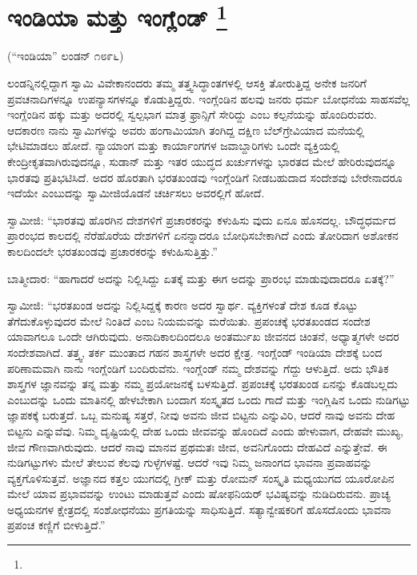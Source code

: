 
\chapter[ಇಂಡಿಯಾ ಮತ್ತು ಇಂಗ್ಲೆಂಡ್ ]{ಇಂಡಿಯಾ ಮತ್ತು ಇಂಗ್ಲೆಂಡ್ \protect\footnote{}}

\centerline{(“ಇಂಡಿಯಾ” ಲಂಡನ್​ ೧೮೯೬)}

ಲಂಡನ್ನಿನಲ್ಲಿದ್ದಾಗ ಸ್ವಾಮಿ ವಿವೇಕಾನಂದರು ತಮ್ಮ ತತ್ತ್ವಸಿದ್ಧಾಂತಗಳಲ್ಲಿ ಆಸಕ್ತಿ ತೋರುತ್ತಿದ್ದ ಅನೇಕ ಜನರಿಗೆ ಪ್ರವಚನಾದಿಗಳನ್ನೂ ಉಪನ್ಯಾಸಗಳನ್ನೂ ಕೊಡುತ್ತಿದ್ದರು. ಇಂಗ್ಲೆಂಡಿನ ಹಲವು ಜನರು ಧರ್ಮ ಬೋಧನೆಯ ಸಾಹಸವೆಲ್ಲ ಇಂಗ್ಲೆಂಡಿನ ಹಕ್ಕು ಮತ್ತು ಅದರಲ್ಲಿ ಸ್ವಲ್ಪಭಾಗ ಮಾತ್ರ ಫ್ರಾನ್ಸಿಗೆ ಸೇರಿದ್ದು ಎಂಬ ಕಲ್ಪನೆಯನ್ನು ಹೊಂದಿರುವರು. ಆದಕಾರಣ ನಾನು ಸ್ವಾಮಿಗಳನ್ನು ಅವರು ಹಂಗಾಮಿಯಾಗಿ ತಂಗಿದ್ದ ದಕ್ಷಿಣ ಬೆಲ್​ಗ್ರೇವಿಯಾದ ಮನೆಯಲ್ಲಿ ಭೇಟಿಮಾಡಲು ಹೋದೆ. ನ್ಯಾಯಾಂಗ ಮತ್ತು ಕಾರ್ಯಾಂಗಗಳ ಜವಾಬ್ದಾರಿಗಳು ಒಂದೇ ವ್ಯಕ್ತಿಯಲ್ಲಿ ಕೇಂದ್ರೀಕೃತವಾಗಿರುವುದನ್ನೂ, ಸುಡಾನ್​ ಮತ್ತು ಇತರ ಯುದ್ಧದ ಖರ್ಚುಗಳನ್ನು ಭಾರತದ ಮೇಲೆ ಹೇರಿರುವುದನ್ನೂ ಭಾರತವು ಪ್ರತಿಭಟಿಸಿದೆ. ಅದರ ಹೊರತಾಗಿ ಭರತಖಂಡವು ಇಂಗ್ಲೆಂಡಿಗೆ ನೀಡಬಹುದಾದ ಸಂದೇಶವು ಬೇರೇನಾದರೂ ಇದೆಯೇ ಎಂಬುದನ್ನು ಸ್ವಾಮೀಜಿಯೊಡನೆ ಚರ್ಚಿಸಲು ಅವರಲ್ಲಿಗೆ ಹೋದೆ.

ಸ್ವಾಮೀಜಿ: “ಭಾರತವು ಹೊರಗಿನ ದೇಶಗಳಿಗೆ ಪ್ರಚಾರಕರನ್ನು ಕಳುಹಿಸು ವುದು ಏನೂ ಹೊಸದಲ್ಲ. ಬೌದ್ಧಧರ್ಮದ ಪ್ರಾರಂಭದ ಕಾಲದಲ್ಲಿ ನೆರೆಹೊರೆಯ ದೇಶಗಳಿಗೆ ಏನನ್ನಾದರೂ ಬೋಧಿಸಬೇಕಾಗಿದೆ ಎಂದು ತೋರಿದಾಗ ಅಶೋಕನ ಕಾಲದಿಂದಲೇ ಭರತಖಂಡವು ಪ್ರಚಾರಕರನ್ನು ಕಳುಹಿಸುತ್ತಿತ್ತು.”

ಬಾತ್ಮೀದಾರ: “ಹಾಗಾದರೆ ಅದನ್ನು ನಿಲ್ಲಿಸಿದ್ದು ಏತಕ್ಕೆ ಮತ್ತು ಈಗ ಅದನ್ನು ಪ್ರಾರಂಭ ಮಾಡುವುದಾದರೂ ಏತಕ್ಕೆ?”

ಸ್ವಾಮೀಜಿ: “ಭರತಖಂಡ ಅದನ್ನು ನಿಲ್ಲಿಸಿದ್ದಕ್ಕೆ ಕಾರಣ ಅದರ ಸ್ವಾರ್ಥ. ವ್ಯಕ್ತಿಗಳಂತೆ ದೇಶ ಕೂಡ ಕೊಟ್ಟು ತೆಗೆದುಕೊಳ್ಳುವುದರ ಮೇಲೆ ನಿಂತಿದೆ ಎಂಬ ನಿಯಮವನ್ನು ಮರೆಯಿತು. ಪ್ರಪಂಚಕ್ಕೆ ಭರತಖಂಡದ ಸಂದೇಶ ಯಾವಾಗಲೂ ಒಂದೇ ಆಗಿರುವುದು. ಅನಾದಿಕಾಲದಿಂದಲೂ ಅಂತರ್ಮುಖ ಜೀವನದ ಚಿಂತನೆ, ಅಧ್ಯಾತ್ಮಗಳೇ ಅದರ ಸಂದೇಶವಾಗಿದೆ. ತತ್ತ್ವ, ತರ್ಕ ಮುಂತಾದ ಗಹನ ಶಾಸ್ತ್ರಗಳೇ ಅದರ ಕ್ಷೇತ್ರ. ಇಂಗ್ಲೆಂಡ್​ ಇಂಡಿಯಾ ದೇಶಕ್ಕೆ ಬಂದ ಪರಿಣಾಮವಾಗಿ ನಾನು ಇಂಗ್ಲೆಂಡಿಗೆ ಬಂದಿರುವೆನು. ಇಂಗ್ಲೆಂಡ್​ ನಮ್ಮ ದೇಶವನ್ನು ಗೆದ್ದು ಆಳುತ್ತಿದೆ. ಅದು ಭೌತಿಕ ಶಾಸ್ತ್ರಗಳ ಜ್ಞಾನವನ್ನು ತನ್ನ ಮತ್ತು ನಮ್ಮ ಪ್ರಯೋಜನಕ್ಕೆ ಬಳಸುತ್ತಿದೆ. ಪ್ರಪಂಚಕ್ಕೆ ಭರತಖಂಡ ಏನನ್ನು ಕೊಡಬಲ್ಲದು ಎಂಬುದನ್ನು ಒಂದು ಮಾತಿನಲ್ಲಿ ಹೇಳಬೇಕಾಗಿ ಬಂದಾಗ ಸಂಸ್ಕೃತದ ಒಂದು ಗಾದೆ ಮತ್ತು ಇಂಗ್ಲಿಷಿನ ಒಂದು ನುಡಿಗಟ್ಟು ಜ್ಞಾಪಕಕ್ಕೆ ಬರುತ್ತದೆ. ಒಬ್ಬ ಮನುಷ್ಯ ಸತ್ತರೆ, ನೀವು ಅವನು ಜೀವ ಬಿಟ್ಟನು ಎನ್ನುವಿರಿ, ಆದರೆ ನಾವು ಅವನು ದೇಹ ಬಿಟ್ಟನು ಎನ್ನುವೆವು. ನಿಮ್ಮ ದೃಷ್ಟಿಯಲ್ಲಿ ದೇಹ ಒಂದು ಜೀವವನ್ನು ಹೊಂದಿದೆ ಎಂದು ಹೇಳುವಾಗ, ದೇಹವೇ ಮುಖ್ಯ, ಜೀವ ಗೌಣವಾಗಿರುವುದು. ಆದರೆ ನಾವು ಮಾನವ ಪ್ರಥಮತಃ ಜೀವ, ಅವನಿಗೊಂದು ದೇಹವಿದೆ ಎನ್ನುತ್ತೇವೆ. ಈ ನುಡಿಗಟ್ಟುಗಳು ಮೇಲೆ ತೇಲುವ ಕೆಲವು ಗುಳ್ಳೆಗಳಷ್ಟೆ. ಆದರೆ ಇವು ನಿಮ್ಮ ಜನಾಂಗದ ಭಾವನಾ ಪ್ರವಾಹವನ್ನು ವ್ಯಕ್ತಗೊಳಿಸುತ್ತವೆ. ಅಜ್ಞಾನದ ಕತ್ತಲ ಯುಗದಲ್ಲಿ ಗ್ರೀಕ್​ ಮತ್ತು ರೋಮನ್​ ಸಂಸ್ಕೃತಿ ಮಧ್ಯಯುಗದ ಯೂರೋಪಿನ ಮೇಲೆ ಯಾವ ಪ್ರಭಾವವನ್ನು ಉಂಟು ಮಾಡುತ್ತವೆ ಎಂದು ಷೋಫನಿಯರ್​ ಭವಿಷ್ಯವನ್ನು ನುಡಿದಿರುವನು. ಪ್ರಾಚ್ಯ ಅಧ್ಯಯನಗಳ ಕ್ಷೇತ್ರದಲ್ಲಿ ಸಂಶೋಧನೆಯು ಪ್ರಗತಿಯನ್ನು ಸಾಧಿಸುತ್ತಿದೆ. ಸತ್ಯಾನ್ವೇಷಕರಿಗೆ ಹೊಸದೊಂದು ಭಾವನಾ ಪ್ರಪಂಚ ಕಣ್ಣಿಗೆ ಬೀಳುತ್ತಿದೆ.”

